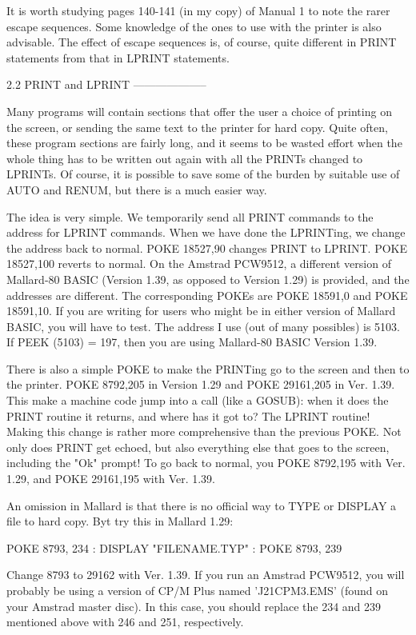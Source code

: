 It is worth studying pages 140-141 (in my copy) of Manual 1 to note the  rarer 
escape  sequences. Some knowledge of the ones to use with the printer is  also 
advisable.  The effect of escape sequences is, of course, quite  different  in 
PRINT statements from that in LPRINT statements.


2.2 PRINT and LPRINT
--------------------

Many  programs will contain sections that offer the user a choice of  printing 
on  the screen, or sending the same text to the printer for hard  copy.  Quite 
often,  these  program  sections are fairly long, and it seems  to  be  wasted 
effort  when the whole thing has to be written out again with all  the  PRINTs 
changed  to LPRINTs. Of course, it is possible to save some of the  burden  by 
suitable use of AUTO and RENUM, but there is a much easier way.

The idea is very simple. We temporarily send all PRINT commands to the address 
for  LPRINT commands. When we have done the LPRINTing, we change  the  address 
back to normal. POKE 18527,90 changes PRINT to LPRINT. POKE 18527,100  reverts 
to  normal.  On the Amstrad PCW9512, a different version of  Mallard-80  BASIC 
(Version 1.39, as opposed to Version 1.29) is provided, and the addresses  are 
different. The corresponding POKEs are POKE 18591,0 and POKE 18591,10. If  you 
are  writing  for users who might be in either version of Mallard  BASIC,  you 
will have to test. The address I use (out of many possibles) is 5103. If  PEEK 
(5103) = 197, then you are using Mallard-80 BASIC Version 1.39.

There is also a simple POKE to make the PRINTing go to the screen and then  to 
the  printer. POKE 8792,205 in Version 1.29 and POKE 29161,205 in  Ver.  1.39. 
This  make  a machine code jump into a call (like a GOSUB): when it  does  the 
PRINT routine it returns, and where has it got to? The LPRINT routine!  Making 
this change is rather more comprehensive than the previous POKE. Not only does 
PRINT get echoed, but also everything else that goes to the screen,  including 
the  "Ok" prompt! To go back to normal, you POKE 8792,195 with Ver. 1.29,  and 
POKE 29161,195 with Ver. 1.39.

An  omission in Mallard is that there is no official way to TYPE or DISPLAY  a 
file to hard copy. Byt try this in Mallard 1.29:

        POKE 8793, 234 : DISPLAY "FILENAME.TYP" : POKE 8793, 239

Change  8793 to 29162 with Ver. 1.39. If you run an Amstrad PCW9512, you  will 
probably  be using a version of CP/M Plus named 'J21CPM3.EMS' (found  on  your 
Amstrad  master  disc).  In  this case, you should replace  the  234  and  239 
mentioned above with 246 and 251, respectively.



